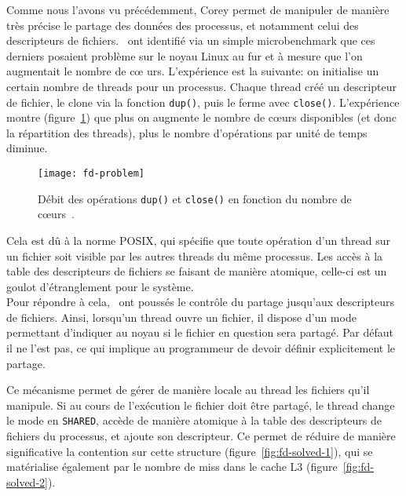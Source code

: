       Comme nous l'avons vu précédemment, Corey permet de manipuler de manière
      très précise le partage des données des processus, et notamment celui des
      descripteurs de fichiers.~\citeauthor{boyd2008corey} ont identifié via un
      simple microbenchmark que ces derniers posaient problème sur le noyau
      Linux au fur et à mesure que l'on augmentait le nombre de c\oe
      urs. L'expérience est la suivante: on initialise un certain nombre de
      threads pour un processus. Chaque thread créé un descripteur de fichier,
      le clone via la fonction \texttt{dup()}, puis le ferme avec
      \texttt{close()}. L'expérience montre (figure~\ref{fig:fd-problem}) que
      plus on augmente le nombre de c\oe urs disponibles (et donc la répartition
      des threads), plus le nombre d'opérations par unité de temps diminue.

      \begin{figure}[ht]
        \centering
        \texttt{[image: fd-problem]}
        \caption{Débit des opérations \texttt{dup()} et \texttt{close()} en
          fonction du nombre de c\oe urs~\citep{boyd2008corey}.}
        \label{fig:fd-problem}
      \end{figure}

      Cela est dû à la norme POSIX, qui spécifie que toute opération d'un thread
      sur un fichier soit visible par les autres threads du même processus. Les
      accès à la table des descripteurs de fichiers se faisant de manière
      atomique, celle-ci est un goulot d'étranglement pour le système.\\

      Pour répondre à cela,~\citeauthor{boyd2008corey} ont poussés le contrôle
      du partage jusqu'aux descripteurs de fichiers. Ainsi, lorsqu'un thread
      ouvre un fichier, il dispose d'un mode permettant d'indiquer au noyau si
      le fichier en question sera partagé. Par défaut il ne l'est pas, ce qui
      implique au programmeur de devoir définir explicitement le partage.

      Ce mécanisme permet de gérer de manière locale au thread les fichiers
      qu'il manipule. Si au cours de l'exécution le fichier doit être partagé,
      le thread change le mode en \texttt{SHARED}, accède de manière atomique à
      la table des descripteurs de fichiers du processus, et ajoute son
      descripteur. Ce permet de réduire de manière significative la contention
      sur cette structure (figure~\ref{fig:fd-solved-1}), qui se matérialise
      également par le nombre de miss dans le cache L3
      (figure~\ref{fig:fd-solved-2}).

